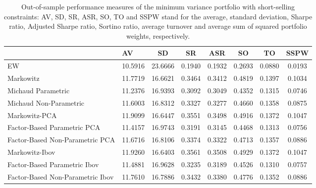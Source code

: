 \begin{table}

\caption{\label{tab:empirical_mvp}Out-of-sample performance measures of the minimum variance portfolio with short-selling constraints: AV, SD, SR, ASR, SO, TO and SSPW stand for the average, standard deviation, Sharpe ratio, Adjusted Sharpe ratio, Sortino ratio, average turnover and average sum of squared portfolio weights, respectively.}
\centering
\begin{tabular}[t]{l|l|c|c|c|c|c|c}
\hline
  & AV & SD & SR & ASR & SO & TO & SSPW\\
\hline
EW & 10.5916 & 23.6666 & 0.1940 & 0.1932 & 0.2693 & 0.0880 & 0.0193\\
\hline
Markowitz & 11.7719 & 16.6621 & 0.3464 & 0.3412 & 0.4819 & 0.1397 & 0.1034\\
\hline
Michaud Parametric & 11.2376 & 16.9393 & 0.3092 & 0.3049 & 0.4352 & 0.1315 & 0.0746\\
\hline
Michaud Non-Parametric & 11.6003 & 16.8312 & 0.3327 & 0.3277 & 0.4660 & 0.1358 & 0.0875\\
\hline
Markowitz-PCA & 11.9099 & 16.6447 & 0.3551 & 0.3498 & 0.4916 & 0.1372 & 0.1047\\
\hline
Factor-Based Parametric PCA & 11.4157 & 16.9743 & 0.3191 & 0.3145 & 0.4468 & 0.1313 & 0.0756\\
\hline
Factor-Based Non-Parametric PCA & 11.6716 & 16.8106 & 0.3374 & 0.3322 & 0.4713 & 0.1357 & 0.0886\\
\hline
Markowitz-Ibov & 11.9260 & 16.6403 & 0.3561 & 0.3508 & 0.4929 & 0.1372 & 0.1047\\
\hline
Factor-Based Parametric Ibov & 11.4881 & 16.9628 & 0.3235 & 0.3189 & 0.4526 & 0.1310 & 0.0757\\
\hline
Factor-Based Non-Parametric Ibov & 11.7610 & 16.7886 & 0.3432 & 0.3380 & 0.4776 & 0.1352 & 0.0886\\
\hline
\end{tabular}
\end{table}
